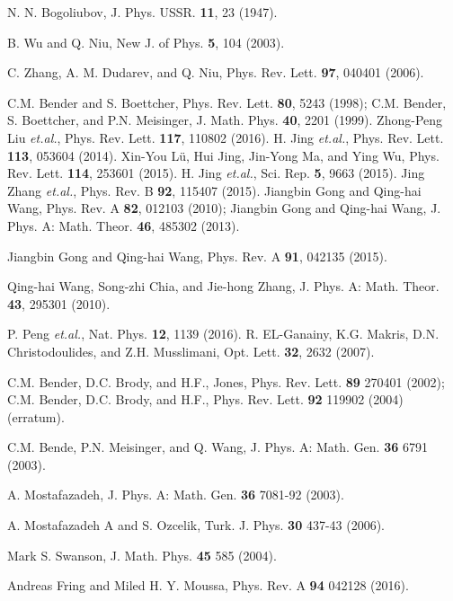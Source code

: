 \documentclass[pra,epsfig,rotate,superscriptaddress,showpacs]{revtex4}
\begin{document}
\begin{thebibliography}{99}

 N. N. Bogoliubov, J. Phys. USSR. {\bf 11}, 23 (1947).

 B. Wu and Q. Niu, New J. of Phys. {\bf 5}, 104 (2003).


 C. Zhang, A. M. Dudarev, and Q. Niu, Phys. Rev. Lett. {\bf 97}, 040401 (2006).

 C.M. Bender and S. Boettcher, Phys. Rev. Lett. {\bf 80}, 5243 (1998); C.M. Bender, S. Boettcher, and P.N. Meisinger, J. Math. Phys. {\bf 40}, 2201 (1999).
 Zhong-Peng Liu {\it et.al.}, Phys. Rev. Lett. {\bf 117}, 110802 (2016).
 H. Jing {\it et.al.}, Phys. Rev. Lett. {\bf 113}, 053604 (2014).
 Xin-You L\"u, Hui Jing, Jin-Yong Ma, and Ying Wu, Phys. Rev. Lett. {\bf 114}, 253601 (2015).
 H. Jing {\it et.al.},  Sci. Rep. {\bf 5}, 9663 (2015).
 Jing Zhang {\it et.al.}, Phys. Rev. B {\bf 92}, 115407 (2015).
 Jiangbin Gong and Qing-hai Wang, Phys. Rev. A {\bf 82}, 012103 (2010); Jiangbin Gong and Qing-hai Wang, J. Phys. A: Math. Theor. {\bf 46}, 485302 (2013).

 Jiangbin Gong and Qing-hai Wang, Phys. Rev. A {\bf 91}, 042135 (2015).

 Qing-hai Wang, Song-zhi Chia, and Jie-hong Zhang, J. Phys. A: Math. Theor. {\bf 43}, 295301 (2010).


 P. Peng {\it et.al.}, Nat. Phys. {\bf 12}, 1139 (2016).
 R. EL-Ganainy, K.G. Makris, D.N. Christodoulides, and Z.H. Musslimani, Opt. Lett. {\bf 32}, 2632 (2007).

 C.M. Bender, D.C. Brody, and H.F., Jones, Phys. Rev.
Lett. {\bf 89} 270401 (2002); C.M. Bender, D.C. Brody, and H.F., Phys. Rev. Lett. {\bf 92} 119902 (2004)(erratum).

 C.M. Bende, P.N. Meisinger, and Q. Wang, J. Phys. A:
Math. Gen. {\bf 36} 6791 (2003).

 A. Mostafazadeh, J. Phys. A: Math. Gen. {\bf 36} 7081-92 (2003).

 A. Mostafazadeh A and S. Ozcelik, Turk. J. Phys. {\bf 30} 437-43 (2006).

 Mark S. Swanson, J. Math. Phys. {\bf 45} 585 (2004).

 Andreas Fring and Miled H. Y. Moussa, Phys. Rev. A {\bf 94} 042128 (2016).



\end{thebibliography}
\end{document}
